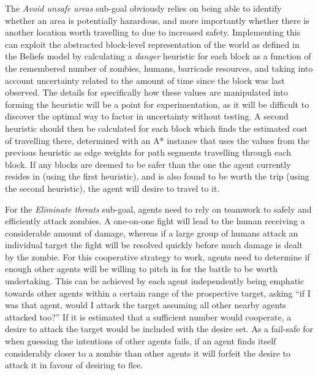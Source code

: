 \documentclass[12pt,a4paper]{article}
\begin{document}
The \emph{Avoid unsafe areas} sub-goal obviously relies on being able to identify whether an area is potentially hazardous, and more importantly whether there is another location worth travelling to due to increased safety. Implementing this can exploit the abstracted block-level representation of the world as defined in the Beliefs model by calculating a \emph{danger} heuristic for each block as a function of the remembered number of zombies, humans, barricade resources, and taking into account uncertainty related to the amount of time since the block was last observed. The details for specifically how these values are manipulated into forming the heuristic will be a point for experimentation, as it will be difficult to discover the optimal way to factor in uncertainty without testing. A second heuristic should then be calculated for each block which finds the estimated cost of travelling there, determined with an A* instance that uses the values from the previous heuristic as edge weights for path segments travelling through each block. If any blocks are deemed to be safer than the one the agent currently resides in (using the first heuristic), and is also found to be worth the trip (using the second heuristic), the agent will desire to travel to it.

For the \emph{Eliminate threats} sub-goal, agents need to rely on teamwork to safely and efficiently attack zombies. A one-on-one fight will lead to the human receiving a considerable amount of damage, whereas if a large group of humans attack an individual target the fight will be resolved quickly before much damage is dealt by the zombie. For this cooperative strategy to work, agents need to determine if enough other agents will be willing to pitch in for the battle to be worth undertaking. This can be achieved by each agent independently being emphatic towards other agents within a certain range of the prospective target, asking ``if I was that agent, would I attack the target assuming all other nearby agents attacked too?'' If it is estimated that a sufficient number would cooperate, a desire to attack the target would be included with the desire set. As a fail-safe for when guessing the intentions of other agents fails, if an agent finds itself considerably closer to a zombie than other agents it will forfeit the desire to attack it in favour of desiring to flee.
\end{document}

